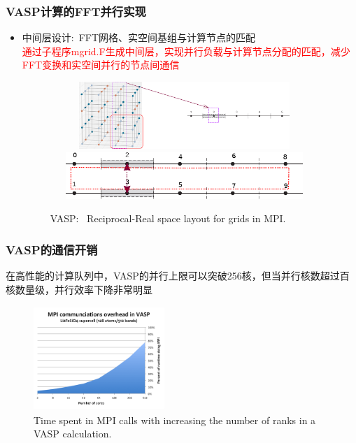 {\frame
{
	\frametitle{\textrm{VASP}计算的\textrm{FFT}并行实现}
	\begin{itemize}
	     \item 中间层设计:~\textrm{FFT}网格、实空间基组与计算节点的匹配\\
		     \textcolor{red}{通过子程序\textrm{mgrid.F}生成中间层，实现并行负载与计算节点分配的匹配，减少\textrm{FFT}变换和实空间并行的节点间通信}
\begin{figure}[h!]
		\vspace{-0.25in}
	\centering
\includegraphics[height=1.0in,width=4.0in,viewport=0 0 1500 450,clip]{Figures/VASP_FFT-MPI_Reciprocal.png}
\vskip 0.5pt
\includegraphics[height=0.7in,width=4.0in,viewport=0 0 730 150,clip]{Figures/VASP_FFT-MPI_Real.png}
\caption{\tiny \textrm{VASP:~ Reciprocal-Real space layout for grids in MPI.}}%
\label{MPI-FFT}
\end{figure} 
	\end{itemize}
}

\frame
{
	\frametitle{\textrm{VASP}的通信开销}
	在高性能的计算队列中，\textrm{VASP}的并行上限可以突破256核，但当并行核数超过百核数量级，并行效率下降非常明显
\begin{figure}[h!]
	\vspace{-0.15in}
\centering
\includegraphics[height=1.55in,width=1.95in,viewport=0 0 240 200,clip]{Figures/VASP-mpi-Li128.png}
\caption{\tiny \textrm{Time spent in MPI calls with increasing the number of ranks in a VASP calculation.}}%
\label{VASP_communication}
\end{figure} 

}}
